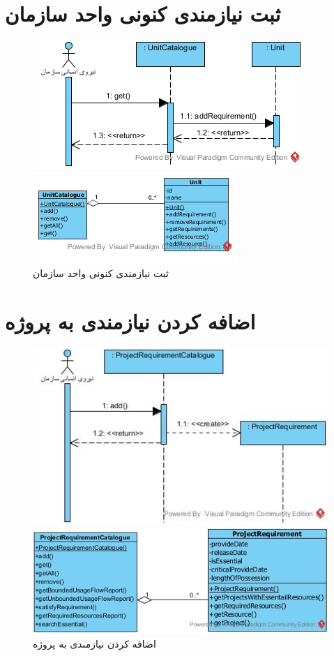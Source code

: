 \section{ثبت نیازمندی کنونی واحد سازمان}
\begin{figure}[H]
	\centering
	\includegraphics[scale=1]{img/sequence-analysis/AddRequirementToUnit}
	
	
	\includegraphics[scale=1]{img/sequence-analysis/AddRequirementToUnitC}
	\caption{ثبت نیازمندی کنونی واحد سازمان}
\end{figure}
\newpage
\section{اضافه کردن نیازمندی به پروژه}
\begin{figure}[H]
	\centering
	\includegraphics[scale=1]{img/sequence-analysis/AddRequirementToProject}
	
	
	\includegraphics[scale=0.8]{img/sequence-analysis/AddRequirementToProjectC}
	\caption{اضافه کردن نیازمندی به پروژه}
\end{figure}

